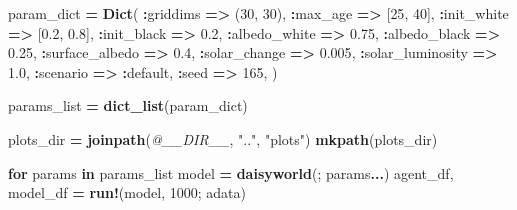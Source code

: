 \documentclass[
  english,
  russian,
  12pt,
  a4paper,
  DIV=11,
  numbers=noendperiod]{scrreprt}
\newenvironment{Shaded}{\begin{snugshade}}{\end{snugshade}}
\newcommand{\ControlFlowTok}[1]{\textcolor[rgb]{0.13,0.29,0.53}{\textbf{#1}}}
\newcommand{\FloatTok}[1]{\textcolor[rgb]{0.00,0.00,0.81}{#1}}
\newcommand{\FunctionTok}[1]{\textcolor[rgb]{0.13,0.29,0.53}{\textbf{#1}}}
\newcommand{\KeywordTok}[1]{\textcolor[rgb]{0.13,0.29,0.53}{\textbf{#1}}}
\newcommand{\NormalTok}[1]{#1}
\newcommand{\OperatorTok}[1]{\textcolor[rgb]{0.81,0.36,0.00}{\textbf{#1}}}
\newcommand{\PreprocessorTok}[1]{\textcolor[rgb]{0.56,0.35,0.01}{\textit{#1}}}
\newcommand{\StringTok}[1]{\textcolor[rgb]{0.31,0.60,0.02}{#1}}
\begin{document}
\begin{Shaded}
\begin{Highlighting}[]
\NormalTok{param\_dict }\OperatorTok{=} \FunctionTok{Dict}\NormalTok{(}
    \OperatorTok{:}\NormalTok{griddims }\OperatorTok{=\textgreater{}}\NormalTok{ (}\FloatTok{30}\NormalTok{, }\FloatTok{30}\NormalTok{),}
    \OperatorTok{:}\NormalTok{max\_age }\OperatorTok{=\textgreater{}}\NormalTok{ [}\FloatTok{25}\NormalTok{, }\FloatTok{40}\NormalTok{],}
    \OperatorTok{:}\NormalTok{init\_white }\OperatorTok{=\textgreater{}}\NormalTok{ [}\FloatTok{0.2}\NormalTok{, }\FloatTok{0.8}\NormalTok{],}
    \OperatorTok{:}\NormalTok{init\_black }\OperatorTok{=\textgreater{}} \FloatTok{0.2}\NormalTok{,}
    \OperatorTok{:}\NormalTok{albedo\_white }\OperatorTok{=\textgreater{}} \FloatTok{0.75}\NormalTok{,}
    \OperatorTok{:}\NormalTok{albedo\_black }\OperatorTok{=\textgreater{}} \FloatTok{0.25}\NormalTok{,}
    \OperatorTok{:}\NormalTok{surface\_albedo }\OperatorTok{=\textgreater{}} \FloatTok{0.4}\NormalTok{,}
    \OperatorTok{:}\NormalTok{solar\_change }\OperatorTok{=\textgreater{}} \FloatTok{0.005}\NormalTok{,}
    \OperatorTok{:}\NormalTok{solar\_luminosity }\OperatorTok{=\textgreater{}} \FloatTok{1.0}\NormalTok{,}
    \OperatorTok{:}\NormalTok{scenario }\OperatorTok{=\textgreater{}} \OperatorTok{:}\NormalTok{default,}
    \OperatorTok{:}\NormalTok{seed }\OperatorTok{=\textgreater{}} \FloatTok{165}\NormalTok{,}
\NormalTok{)}

\NormalTok{params\_list }\OperatorTok{=} \FunctionTok{dict\_list}\NormalTok{(param\_dict)}

\NormalTok{plots\_dir }\OperatorTok{=} \FunctionTok{joinpath}\NormalTok{(}\PreprocessorTok{@\_\_DIR\_\_}\NormalTok{, }\StringTok{".."}\NormalTok{, }\StringTok{"plots"}\NormalTok{)}
\FunctionTok{mkpath}\NormalTok{(plots\_dir)}

\ControlFlowTok{for}\NormalTok{ params }\KeywordTok{in}\NormalTok{ params\_list}
\NormalTok{    model }\OperatorTok{=} \FunctionTok{daisyworld}\NormalTok{(; params}\OperatorTok{...}\NormalTok{)}
\NormalTok{    agent\_df, model\_df }\OperatorTok{=} \FunctionTok{run!}\NormalTok{(model, }\FloatTok{1000}\NormalTok{; adata)}


\end{Highlighting}
\end{Shaded}
\end{document}
